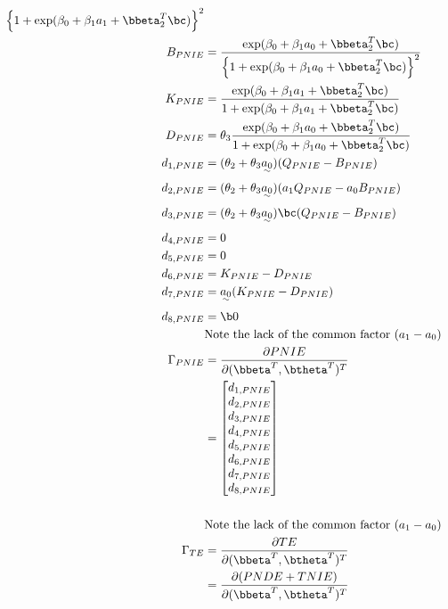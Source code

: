 \documentclass[dvipdfmx,10pt]{article}
\begin{document}
\begin{align*}
      {\left\{ 1 + \exp(\beta_{0} + \beta_{1}a_{1} + \bbeta_{2}^{T}\bc) \right\}^{2}}\\
  B_{PNIE} &= \frac
      {            \exp(\beta_{0} + \beta_{1}a_{0} + \bbeta_{2}^{T}\bc)}
      {\left\{ 1 + \exp(\beta_{0} + \beta_{1}a_{0} + \bbeta_{2}^{T}\bc) \right\}^{2}}\\
  K_{PNIE} &= \frac
      {    \exp(\beta_{0} + \beta_{1}a_{1} + \bbeta_{2}^{T}\bc)}
      {1 + \exp(\beta_{0} + \beta_{1}a_{1} + \bbeta_{2}^{T}\bc)}\\
  D_{PNIE} &= \theta_{3} \frac
      {    \exp(\beta_{0} + \beta_{1}a_{0} + \bbeta_{2}^{T}\bc)}
      {1 + \exp(\beta_{0} + \beta_{1}a_{0} + \bbeta_{2}^{T}\bc)}\\
  d_{1,PNIE} &= (\theta_{2} + \theta_{3}\uwave{a_{0}}) (Q_{PNIE} - B_{PNIE})\\
  d_{2,PNIE} &= (\theta_{2} + \theta_{3}\uwave{a_{0}}) (a_{1}Q_{PNIE} - a_{0}B_{PNIE})\\
  d_{3,PNIE} &= (\theta_{2} + \theta_{3}\uwave{a_{0}})\bc (Q_{PNIE} - B_{PNIE})\\
  d_{4,PNIE} &= 0\\
  d_{5,PNIE} &= 0\\
  d_{6,PNIE} &= K_{PNIE} - D_{PNIE}\\
  d_{7,PNIE} &= \uwave{a_{0}} (K_{PNIE} - D_{PNIE})\\
  d_{8,PNIE} &= \b0\\
  &\text{Note the lack of the common factor }(a_{1} - a_{0})\\
  \Gamma_{PNIE}
  &= \frac{\partial PNIE}{\partial (\bbeta^{T},\btheta^{T})^{T}}\\
  &= \begin{bmatrix}
      d_{1,PNIE}\\
      d_{2,PNIE}\\
      d_{3,PNIE}\\
      d_{4,PNIE}\\
      d_{5,PNIE}\\
      d_{6,PNIE}\\
      d_{7,PNIE}\\
      d_{8,PNIE}\\
    \end{bmatrix}\\
  \\
  &\text{Note the lack of the common factor }(a_{1} - a_{0})\\
  \Gamma_{TE}
  &= \frac{\partial TE}{\partial (\bbeta^{T},\btheta^{T})^{T}}\\
  &= \frac{\partial (PNDE+TNIE)}{\partial (\bbeta^{T},\btheta^{T})^{T}}\\

\end{align*}
\end{document}
